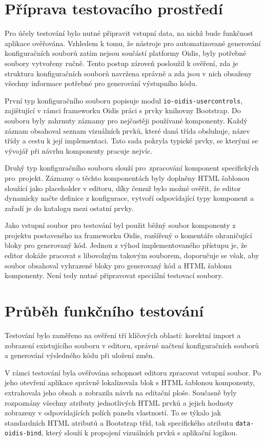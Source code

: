 \section{Příprava testovacího prostředí}

Pro účely testování bylo nutné připravit vstupní data, na nichž bude funkčnost aplikace ověřována. Vzhledem k tomu, že nástroje pro automatizované generování konfiguračních souborů zatím nejsou součástí platformy Oidis, byly potřebné soubory vytvořeny ručně. Tento postup zároveň posloužil k ověření, zda je struktura konfiguračních souborů navržena správně a zda jsou v nich obsaženy 
všechny informace potřebné pro generování výstupního kódu.

První typ konfiguračního souboru popisuje modul \texttt{io-oidis-usercontrols}, zajištující v rámci frameworku Oidis práci s prvky knihovny Bootstrap. Do souboru byly zahrnuty záznamy pro nejčastěji používané komponenty. Každý záznam obsahoval seznam vizuálních prvků, které daná třída obsluhuje, název třídy a cestu k její implementaci. Tato sada pokryla typické prvky, se kterými se vývojář při návrhu komponenty pracuje nejvíc.

Druhý typ konfiguračního souboru slouží pro~zpracování komponent specifických pro~projekt. Záznamy o těchto komponentách byly doplněny HTML šablonou sloužící jako placeholder v editoru, díky čemuž bylo možné ověřit, že editor dynamicky načte definice z konfigurace, vytvoří odpovídající typy komponent a zařadí je do katalogu mezi ostatní prvky.

Jako vstupní soubor pro testování byl použit běžný soubor komponenty z projektu postaveného na frameworku Oidis, rozšířený o komentáře ohraničující bloky pro generovaný kód. Jednou z výhod implementovaného přístupu je, že editor dokáže pracovat s libovolným takovým souborem, doporučuje se však, aby soubor obsahoval vyhrazené bloky pro generovaný kód a HTML šablonu komponenty. Není tedy nutné připravovat speciální testovací soubory.

\section{Průběh funkčního testování}

Testování bylo zaměřeno na ověření tří klíčových oblastí: korektní import a zobrazení existujícího souboru v editoru, správné načtení konfiguračních souborů a generování výsledného kódu při uložení změn.

V rámci testování byla ověřována schopnost editoru zpracovat vstupní soubor. Po jeho otevření aplikace správně lokalizovala blok s HTML šablonou komponenty, extrahovala jeho obsah a zobrazila návrh na editační ploše. Současně byly rozpoznány všechny atributy jednotlivých HTML prvků a jejich hodnoty zobrazeny v odpovídajících polích panelu vlastností. To se týkalo jak standardních HTML atributů a Bootstrap tříd, tak specifického atributu \texttt{data-oidis-bind}, který slouží k propojení vizuálních prvků s aplikační logikou.

